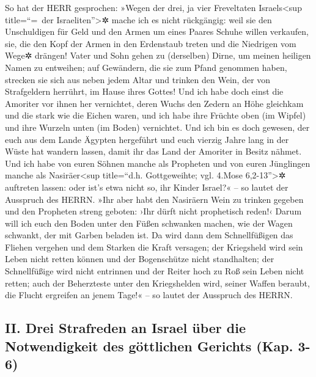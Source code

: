 So hat der HERR gesprochen: »Wegen der drei, ja vier
Freveltaten Israels\textless sup title=``=~der Israeliten''\textgreater✲
mache ich es nicht rückgängig: weil sie den Unschuldigen für Geld und
den Armen um eines Paares Schuhe willen verkaufen, sie,
die den Kopf der Armen in den Erdenstaub treten und die Niedrigen vom
Wege✲ drängen! Vater und Sohn gehen zu (derselben) Dirne, um meinen
heiligen Namen zu entweihen; auf Gewändern, die sie zum
Pfand genommen haben, strecken sie sich aus neben jedem Altar und
trinken den Wein, der von Strafgeldern herrührt, im Hause ihres Gottes!
Und ich habe doch einst die Amoriter vor ihnen her
vernichtet, deren Wuchs den Zedern an Höhe gleichkam und die stark wie
die Eichen waren, und ich habe ihre Früchte oben (im Wipfel) und ihre
Wurzeln unten (im Boden) vernichtet. Und ich bin es doch
gewesen, der euch aus dem Lande Ägypten hergeführt und euch vierzig
Jahre lang in der Wüste hat wandern lassen, damit ihr das Land der
Amoriter in Besitz nähmet. Und ich habe von euren Söhnen
manche als Propheten und von euren Jünglingen manche als
Nasiräer\textless sup title=``d.h. Gottgeweihte; vgl. 4.Mose
6,2-13''\textgreater✲ auftreten lassen: oder ist's etwa nicht so, ihr
Kinder Israel?« -- so lautet der Ausspruch des HERRN.
»Ihr aber habt den Nasiräern Wein zu trinken gegeben und
den Propheten streng geboten: ›Ihr dürft nicht prophetisch reden!‹
Darum will ich euch den Boden unter den Füßen schwanken
machen, wie der Wagen schwankt, der mit Garben beladen ist.
Da wird dann dem Schnellfüßigen das Fliehen vergehen und
dem Starken die Kraft versagen; der Kriegsheld wird sein Leben nicht
retten können und der Bogenschütze nicht standhalten; der
Schnellfüßige wird nicht entrinnen und der Reiter hoch zu Roß sein Leben
nicht retten; auch der Beherzteste unter den Kriegshelden
wird, seiner Waffen beraubt, die Flucht ergreifen an jenem Tage!« -- so
lautet der Ausspruch des HERRN.

\hypertarget{ii.-drei-strafreden-an-israel-uxfcber-die-notwendigkeit-des-guxf6ttlichen-gerichts-kap.-3-6}{%
\subsection{II. Drei Strafreden an Israel über die Notwendigkeit des
göttlichen Gerichts (Kap.
3-6)}\label{ii.-drei-strafreden-an-israel-uxfcber-die-notwendigkeit-des-guxf6ttlichen-gerichts-kap.-3-6}}

